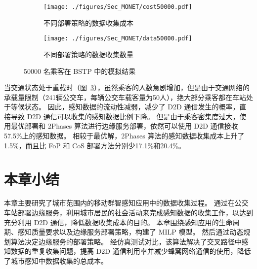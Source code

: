 \begin{figure}[!h]
  \centering
  \begin{subfigure}[b]{0.45\linewidth}
    \texttt{[image: ./figures/Sec\_MONET/cost50000.pdf]}
    \label{fig_cost50000}
    \vspace{-2em}
    \caption{不同部署策略的数据收集成本}
  \end{subfigure}
  \begin{subfigure}[b]{0.45\linewidth}
    \texttt{[image: ./figures/Sec\_MONET/data50000.pdf]}
    \label{fig_data50000}
    \vspace{-2em}
    \caption{不同部署策略的数据收集数量}
  \end{subfigure}
    \vspace{-0.5em}
    \caption{50000 名乘客在 BSTP 中的模拟结果}
  \label{fig_50000}
\end{figure}

当交通状态处于重载时（图~\ref{fig_50000}），虽然乘客的人数急剧增加，但是由于交通网络的承载量限制（241辆公交车，每辆公交车载客量为50人），绝大部分乘客都在车站处于等候状态。
因此，感知数据的流动性减弱，减少了 D2D 通信发生的概率，直接导致 D2D 通信可以收集的感知数据比例下降。
但是由于乘客密集度过大，使用最优部署和 2\-Phases 算法进行边缘服务部署，依然可以使用 D2D 通信接收57.5\%上的感知数据。
相较于最优解，2\-Phases 算法的感知数据收集成本上升了1.5\%，而且比 FoP 和 CoS 部署方法分别少17.1\%和20.4\%。

\section{本章小结}

本章主要研究了城市范围内的移动群智感知应用中的数据收集过程。
通过在公交车站部署边缘服务，利用城市居民的社会活动来完成感知数据的收集工作，以达到充分利用 D2D 通信，降低数据收集成本的目的。
本章围绕感知应用的生命周期、感知质量要求以及边缘服务部署策略，构建了 MILP 模型。
然后通过动态规划算法决定边缘服务的部署策略。
经仿真测试对比，该算法解决了交叉路径中感知数据的重复收集问题，提高 D2D 通信利用率并减少蜂窝网络通信的使用，降低了城市感知中数据收集的总成本。

